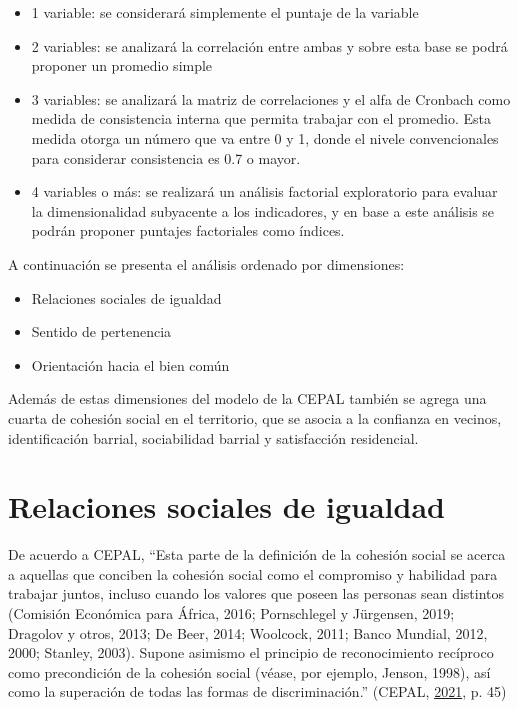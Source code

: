 \documentclass[
  12pt,
]{book}
\providecommand{\tightlist}{%
  \setlength{\itemsep}{0pt}\setlength{\parskip}{0pt}}
\begin{document}
\begin{itemize}
\item
  1 variable: se considerará simplemente el puntaje de la variable
\item
  2 variables: se analizará la correlación entre ambas y sobre esta base se podrá proponer un promedio simple
\item
  3 variables: se analizará la matriz de correlaciones y el alfa de Cronbach como medida de consistencia interna que permita trabajar con el promedio. Esta medida otorga un número que va entre 0 y 1, donde el nivele convencionales para considerar consistencia es 0.7 o mayor.
\item
  4 variables o más: se realizará un análisis factorial exploratorio para evaluar la dimensionalidad subyacente a los indicadores, y en base a este análisis se podrán proponer puntajes factoriales como índices.
\end{itemize}

A continuación se presenta el análisis ordenado por dimensiones:

\begin{itemize}
\tightlist
\item
  Relaciones sociales de igualdad
\item
  Sentido de pertenencia
\item
  Orientación hacia el bien común
\end{itemize}

Además de estas dimensiones del modelo de la CEPAL también se agrega una cuarta de cohesión social en el territorio, que se asocia a la confianza en vecinos, identificación barrial, sociabilidad barrial y satisfacción residencial.

\hypertarget{relaciones-sociales-de-igualdad}{%
\section{Relaciones sociales de igualdad}\label{relaciones-sociales-de-igualdad}}

De acuerdo a CEPAL, ``Esta parte de la definición de la cohesión social se acerca a aquellas que conciben la cohesión social como el compromiso y habilidad para trabajar juntos, incluso cuando los valores que poseen las personas sean distintos (Comisión Económica para África, 2016; Pornschlegel y Jürgensen, 2019; Dragolov y otros, 2013; De Beer, 2014; Woolcock, 2011; Banco Mundial, 2012, 2000; Stanley, 2003). Supone asimismo el principio de reconocimiento recíproco como precondición de la cohesión social (véase, por ejemplo, Jenson, 1998), así como la superación de todas las formas de discriminación.'' (CEPAL, \protect\hyperlink{ref-cepal_Cohesion_2021}{2021}, p. 45)
\end{document}
